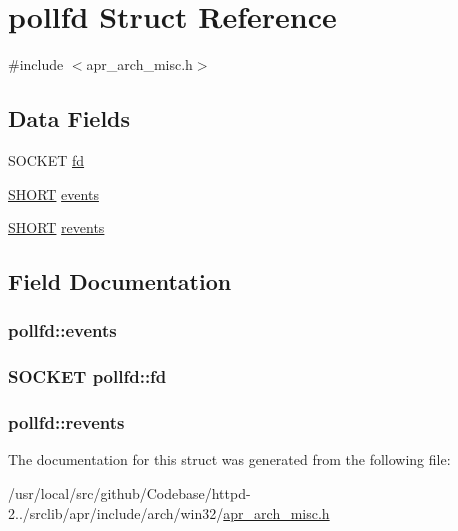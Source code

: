 \hypertarget{structpollfd}{}\section{pollfd Struct Reference}
\label{structpollfd}


{\ttfamily \#include $<$apr\+\_\+arch\+\_\+misc.\+h$>$}

\subsection*{Data Fields}
\begin{DoxyCompactItemize}
\item 
S\+O\+C\+K\+ET \hyperlink{structpollfd_a24e6b7a71f146721f56620a6f8e7606a}{fd}
\item 
\hyperlink{mod__mime__magic_8c_a9fbb14850a9f176447733a089071cd70}{S\+H\+O\+RT} \hyperlink{structpollfd_a73d34a5c5ca1d74b9a999f9e93402798}{events}
\item 
\hyperlink{mod__mime__magic_8c_a9fbb14850a9f176447733a089071cd70}{S\+H\+O\+RT} \hyperlink{structpollfd_a1c25eff2bc2850786c17f83ec7bc97c4}{revents}
\end{DoxyCompactItemize}


\subsection{Field Documentation}
\subsubsection[{\texorpdfstring{events}{events}}]{ pollfd\+::events}\hypertarget{structpollfd_a73d34a5c5ca1d74b9a999f9e93402798}{}\label{structpollfd_a73d34a5c5ca1d74b9a999f9e93402798}
\subsubsection[{\texorpdfstring{fd}{fd}}]{\setlength{\rightskip}{0pt plus 5cm}S\+O\+C\+K\+ET pollfd\+::fd}\hypertarget{structpollfd_a24e6b7a71f146721f56620a6f8e7606a}{}\label{structpollfd_a24e6b7a71f146721f56620a6f8e7606a}
\subsubsection[{\texorpdfstring{revents}{revents}}]{ pollfd\+::revents}\hypertarget{structpollfd_a1c25eff2bc2850786c17f83ec7bc97c4}{}\label{structpollfd_a1c25eff2bc2850786c17f83ec7bc97c4}


The documentation for this struct was generated from the following file\+:\begin{DoxyCompactItemize}
\item 
/usr/local/src/github/\+Codebase/httpd-\/2../srclib/apr/include/arch/win32/\hyperlink{win32_2apr__arch__misc_8h}{apr\+\_\+arch\+\_\+misc.\+h}\end{DoxyCompactItemize}

